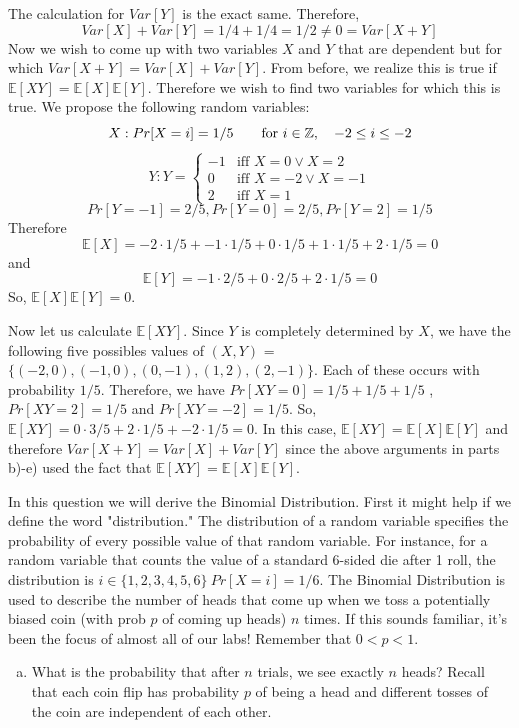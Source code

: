 \documentclass[]{article}
\def \exx {\mathbb{E}}
\begin{document}
\begin{qunlist}
\begin{enumerate}[a)]
{{The calculation for $Var[Y]$ is the exact same. Therefore, 
\[Var[X] + Var[Y] = 1/4 + 1/4 = 1/2 \neq 0 = Var[X+Y]\] 
Now we wish to come up with two variables $X$ and $Y$ that are dependent but for which $Var[X+Y] = Var[X] + Var[Y]$. From before, we realize this is true if $\exx[XY] = \exx[X]\exx[Y]$. Therefore we wish to find two variables for which this is true. We propose the following random variables: 
\[X: \\
Pr[X=i] = 1/5 \quad\quad \text{for } i \in \mathbb{Z}, \quad -2 \leq i \leq -2  \]
\[Y: Y=\begin{cases}
       -1 &\mbox{iff } X=0 \lor X=2 \\
       0  &\mbox{iff } X=-2 \lor X=-1 \\
       2  &\mbox{iff } X=1
       \end{cases} 
\]
\[Pr[Y=-1]=2/5, Pr[Y=0]=2/5, Pr[Y=2]=1/5\]
Therefore 
\[ \exx[X] = -2 \cdot 1/5 + -1 \cdot 1/5 + 0 \cdot 1/5 + 1 \cdot 1/5 + 2 \cdot 1/5 = 0\] 
and 
\[ \exx[Y] = -1 \cdot 2/5 + 0 \cdot 2/5 + 2 \cdot 1/5 = 0\]
So, $\exx[X]\exx[Y] = 0$. 

Now let us calculate $\exx[XY]$. Since $Y$ is completely determined by $X$, we have the following five possibles values of $(X,Y)$ = $\{ (-2,0), (-1,0), (0,-1), (1, 2), (2,-1) \}$. Each of these occurs with probability $1/5$. Therefore, we have $Pr[XY = 0] = 1/5 + 1/5 + 1/5$ , $Pr[XY = 2] = 1/5$ and $Pr[XY = -2] = 1/5$. So, $\exx[XY] = 0 \cdot 3/5 + 2 \cdot 1/5 + -2 \cdot 1/5 = 0$. In this case, $\exx[XY] = \exx[X]\exx[Y]$ and therefore $Var[X+Y] = Var[X] + Var[Y]$ since the above arguments in parts b)-e) used the fact that $\exx[XY] = \exx[X]\exx[Y]$.
}}
\fi
\end{enumerate}


\newpage
  
In this question we will derive the Binomial Distribution. First it might help if we define the word "distribution." The distribution of a random variable specifies the probability of every possible value of that random variable. For instance, for a random variable that counts the value of a standard 6-sided die after 1 roll, the distribution is $i \in \{1,2,3,4,5,6\} \ Pr[X = i] = 1/6$. %
The Binomial Distribution is used to describe the number of heads that
come up when we toss a potentially biased coin (with prob $p$ of
coming up heads) $n$ times. If this sounds familiar, it's been the focus of almost all of our labs! Remember that $0 < p < 1$.
\begin{enumerate}[a)]
\qpart
\item What is the probability that after $n$ trials, we see exactly
  $n$ heads? Recall that each coin flip has probability $p$ of being a
  head and different tosses of the coin are independent of each other.
  

\end{enumerate}
\end{qunlist}
\end{document}
